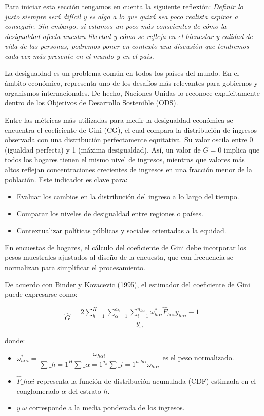 \documentclass[
  12pt,
]{book}
\providecommand{\tightlist}{%
  \setlength{\itemsep}{0pt}\setlength{\parskip}{0pt}}
\begin{document}
Para iniciar esta sección tengamos en cuenta la siguiente reflexión: \emph{Definir lo justo siempre será difícil y es algo a lo que quizá sea poco realista aspirar a conseguir. Sin embargo, si estamos un poco más conscientes de cómo la desigualdad afecta nuestra libertad y cómo se refleja en el bienestar y calidad de vida de las personas, podremos poner en contexto una discusión que tendremos cada vez más presente en el mundo y en el país.}

La desigualdad es un problema común en todos los países del mundo. En el ámbito económico, representa uno de los desafíos más relevantes para gobiernos y organismos internacionales. De hecho, Naciones Unidas lo reconoce explícitamente dentro de los Objetivos de Desarrollo Sostenible (ODS).

Entre las métricas más utilizadas para medir la desigualdad económica se encuentra el coeficiente de Gini (CG), el cual compara la distribución de ingresos observada con una distribución perfectamente equitativa. Su valor oscila entre 0 (igualdad perfecta) y 1 (máxima desigualdad). Así, un valor de \(G = 0\) implica que todos los hogares tienen el mismo nivel de ingresos, mientras que valores más altos reflejan concentraciones crecientes de ingresos en una fracción menor de la población. Este indicador es clave para:

\begin{itemize}
\tightlist
\item
  Evaluar los cambios en la distribución del ingreso a lo largo del tiempo.
\item
  Comparar los niveles de desigualdad entre regiones o países.
\item
  Contextualizar políticas públicas y sociales orientadas a la equidad.
\end{itemize}

En encuestas de hogares, el cálculo del coeficiente de Gini debe incorporar los pesos muestrales ajustados al diseño de la encuesta, que con frecuencia se normalizan para simplificar el procesamiento.

De acuerdo con Binder y Kovacevic (1995), el estimador del coeficiente de Gini puede expresarse como:

\[
\hat{G} = \frac{2\sum_{h=1}^{H}\sum_{\alpha=1}^{a_{h}}\sum_{i=1}^{n_{h\alpha}}\omega_{h\alpha i}^{*}\hat{F}_{h\alpha i}y_{h\alpha i}-1}{\bar{y}_{\omega}}
\]

donde:

\begin{itemize}
\tightlist
\item
  \(\omega_{h\alpha i}^{*}=\dfrac{\omega_{h\alpha i}}{\sum\_{h=1}^{H}\sum\_{\alpha=1}^{a_{h}}\sum\_{i=1}^{n\_{h\alpha}}\omega_{h\alpha i}}\) es el peso normalizado.
\item
  \(\hat{F}\_{h\alpha i}\) representa la función de distribución acumulada (CDF) estimada en el conglomerado \(\alpha\) del estrato \(h\).
\item
  \(\bar{y}\_{\omega}\) corresponde a la media ponderada de los ingresos.
\end{itemize}
\end{document}

